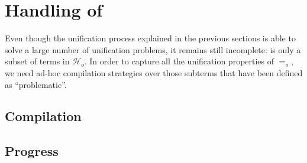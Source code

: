 \documentclass[sigconf,natbib=false,review]{acmart}
\newcommand{\EqualRel}{\ensuremath{=}}
\newcommand{\Eo}{\ensuremath{\EqualRel_o}\xspace}
\newcommand{\Ho}{\ensuremath{\mathcal{H}_o}\xspace}
\begin{document}







\section{Handling of \maybeeta}\label{sec:eta}

Even though the unification process explained in the previous sections is able
to solve a large number of unification problems, it remains still incomplete:
\wellb is only a subset of terms in \Ho. In order to capture all the unification
properties of \Eo, we need ad-hoc compilation strategies over those subterms
that have been defined as ``problematic''.


\subsection{Compilation}
\subsection{Progress}
\end{document}
